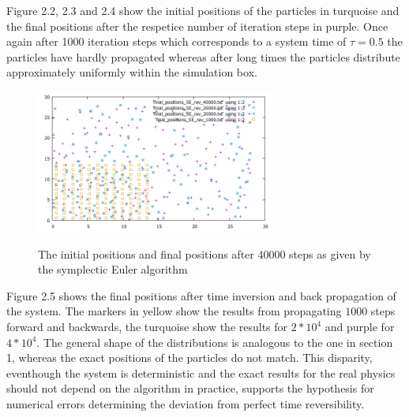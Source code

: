 \documentclass[12pt,a4paper]{article}	%
\begin{document}
Figure 2.2, 2.3 and 2.4 show the initial positions of the particles in turquoise and the final positions after the respetice number of iteration steps in purple. Once again after 1000 iteration steps which corresponds to a system time of $\tau = 0.5$ the particles have hardly propagated whereas after long times the particles distribute approximately uniformly within the simulation box. \\
\newpage

\begin{figure}[h!]	
\centering
{\includegraphics[width=0.7\textwidth]{final_positions_rev_SE.png}}		
\caption{The initial positions and final positions after 40000 steps as given by the symplectic Euler algorithm}
\end{figure}


Figure 2.5 shows the final positions after time inversion and back propagation of the system. The markers in yellow show the results from propagating $1000$ steps forward and backwards, the turquoise show the results for $2*10^4$ and purple for $4*10^4$. The general shape of the distributions is analogous to the one in section 1, whereas the exact positions of the particles do not match. 
This disparity, eventhough the system is deterministic and the exact results for the real physics should not depend on the algorithm in practice, supports the hypothesis for numerical errors determining the deviation from perfect time reversibility. 



\end{document}
